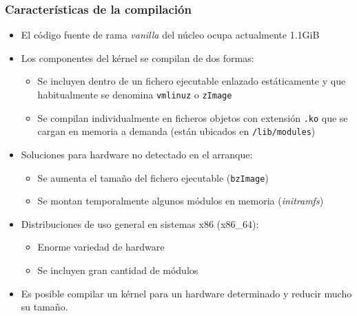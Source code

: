 \documentclass{beamer}
\begin{document}
\begin{frame} \frametitle{Características de la compilación}
  \begin{itemize}
  \item El código fuente de rama \textit{vanilla} del núcleo ocupa actualmente 1.1GiB 
  \item Los componentes del kérnel se compilan de dos formas:
    \begin{itemize}
    \item Se incluyen dentro de un fichero ejecutable enlazado
      estáticamente y que habitualmente se denomina \texttt{vmlinuz} o
      \texttt{zImage}
    \item Se compilan individualmente en ficheros objetos con
      extensión \texttt{.ko} que se cargan en memoria a demanda
      (están ubicados en \texttt{/lib/modules})
    \end{itemize}
  \item Soluciones para hardware no detectado en el arranque:
    \begin{itemize}
    \item Se aumenta el tamaño del fichero ejecutable (\texttt{bzImage})
    \item Se montan temporalmente algunos módulos en memoria (\textit{initramfs})
    \end{itemize}
  \item Distribuciones de uso general en sistemas x86 (x86\_64):
    \begin{itemize}
    \item Enorme variedad de hardware
    \item Se incluyen gran cantidad de módulos
    \end{itemize}
  \item Es posible compilar un kérnel para un hardware determinado y
    reducir mucho su tamaño.
  \end{itemize}
\end{frame}
\end{document}
